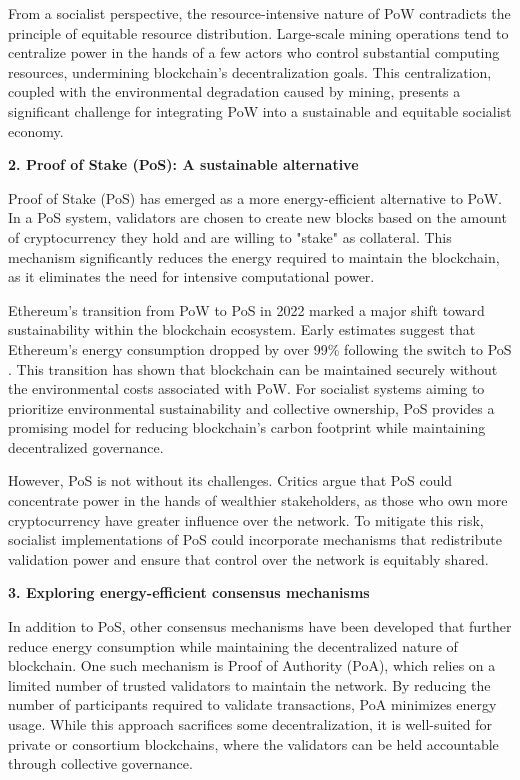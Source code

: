 \begin{refsection}
From a socialist perspective, the resource-intensive nature of PoW contradicts the principle of equitable resource distribution. Large-scale mining operations tend to centralize power in the hands of a few actors who control substantial computing resources, undermining blockchain’s decentralization goals. This centralization, coupled with the environmental degradation caused by mining, presents a significant challenge for integrating PoW into a sustainable and equitable socialist economy.

\textbf{2. Proof of Stake (PoS): A sustainable alternative}

Proof of Stake (PoS) has emerged as a more energy-efficient alternative to PoW. In a PoS system, validators are chosen to create new blocks based on the amount of cryptocurrency they hold and are willing to "stake" as collateral. This mechanism significantly reduces the energy required to maintain the blockchain, as it eliminates the need for intensive computational power.

Ethereum’s transition from PoW to PoS in 2022 marked a major shift toward sustainability within the blockchain ecosystem. Early estimates suggest that Ethereum’s energy consumption dropped by over 99\% following the switch to PoS \cite[pp.~89-90]{tapscott2016}. This transition has shown that blockchain can be maintained securely without the environmental costs associated with PoW. For socialist systems aiming to prioritize environmental sustainability and collective ownership, PoS provides a promising model for reducing blockchain’s carbon footprint while maintaining decentralized governance.

However, PoS is not without its challenges. Critics argue that PoS could concentrate power in the hands of wealthier stakeholders, as those who own more cryptocurrency have greater influence over the network. To mitigate this risk, socialist implementations of PoS could incorporate mechanisms that redistribute validation power and ensure that control over the network is equitably shared.

\textbf{3. Exploring energy-efficient consensus mechanisms}

In addition to PoS, other consensus mechanisms have been developed that further reduce energy consumption while maintaining the decentralized nature of blockchain. One such mechanism is Proof of Authority (PoA), which relies on a limited number of trusted validators to maintain the network. By reducing the number of participants required to validate transactions, PoA minimizes energy usage. While this approach sacrifices some decentralization, it is well-suited for private or consortium blockchains, where the validators can be held accountable through collective governance.


\end{refsection}
